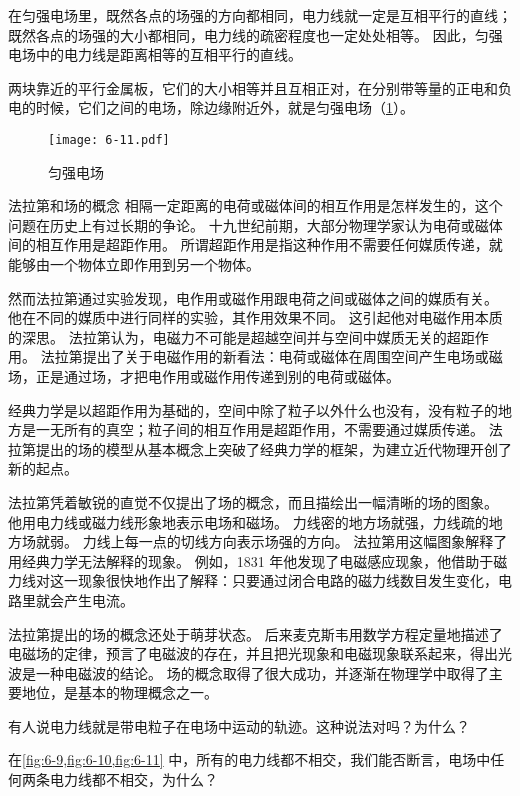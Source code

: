 在匀强电场里，既然各点的场强的方向都相同，电力线就一定是互相平行的直线；既然各点的场强的大小都相同，电力线的疏密程度也一定处处相等。
因此，匀强电场中的电力线是距离相等的互相平行的直线。

两块靠近的平行金属板，它们的大小相等并且互相正对，在分别带等量的正电和负
电的时候，它们之间的电场，除边缘附近外，就是匀强电场（\cref{fig:6-11}）。

\begin{figure}
	\texttt{[image: 6-11.pdf]}
	\caption{匀强电场}\label{fig:6-11}
\end{figure}

\begin{Reading}{法拉第和场的概念}
相隔一定距离的电荷或磁体间的相互作用是怎样发生的，这个问题在历史上有过长期的争论。
十九世纪前期，大部分物理学家认为电荷或磁体间的相互作用是超距作用。
所谓超距作用是指这种作用不需要任何媒质传递，就能够由一个物体立即作用到另一个物体。

然而法拉第通过实验发现，电作用或磁作用跟电荷之间或磁体之间的媒质有关。
他在不同的媒质中进行同样的实验，其作用效果不同。
这引起他对电磁作用本质的深思。
法拉第认为，电磁力不可能是超越空间并与空间中媒质无关的超距作用。
法拉第提出了关于电磁作用的新看法：电荷或磁体在周围空间产生电场或磁场，正是通过场，才把电作用或磁作用传递到别的电荷或磁体。

经典力学是以超距作用为基础的，空间中除了粒子以外什么也没有，没有粒子的地方是一无所有的真空；粒子间的相互作用是超距作用，不需要通过媒质传递。
法拉第提出的场的模型从基本概念上突破了经典力学的框架，为建立近代物理开创了新的起点。

法拉第凭着敏锐的直觉不仅提出了场的概念，而且描绘出一幅清晰的场的图象。
他用电力线或磁力线形象地表示电场和磁场。
力线密的地方场就强，力线疏的地方场就弱。
力线上每一点的切线方向表示场强的方向。
法拉第用这幅图象解释了用经典力学无法解释的现象。
例如，1831 年他发现了电磁感应现象，他借助于磁力线对这一现象很快地作出了解释：只要通过闭合电路的磁力线数目发生变化，电路里就会产生电流。

法拉第提出的场的概念还处于萌芽状态。
后来麦克斯韦用数学方程定量地描述了电磁场的定律，预言了电磁波的存在，并且把光现象和电磁现象联系起来，得出光波是一种电磁波的结论。
场的概念取得了很大成功，并逐渐在物理学中取得了主要地位，是基本的物理概念之一。
\end{Reading}

\begin{Practice}
\begin{question}
	\item 有人说电力线就是带电粒子在电场中运动的轨迹。这种说法对吗？为什么？
	\item 在\cref{fig:6-9,fig:6-10,fig:6-11} 中，所有的电力线都不相交，我们能否断言，电场中任何两条电力线都不相交，为什么？
\end{question}
\end{Practice}

